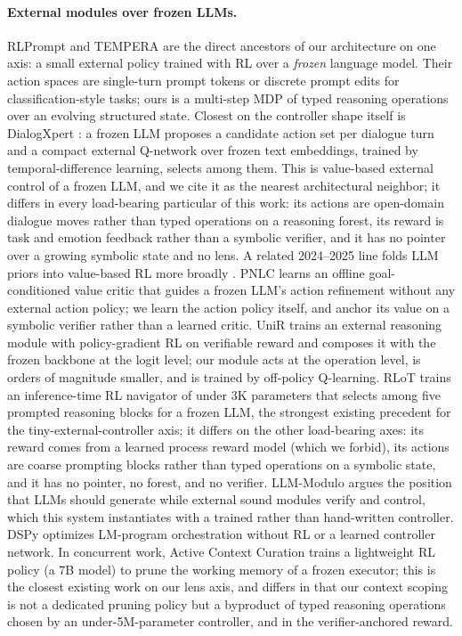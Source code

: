 \paragraph{External modules over frozen LLMs.}
RLPrompt \citep{rlprompt} and TEMPERA \citep{tempera} are the direct
ancestors of our architecture on one axis: a small external policy trained
with RL over a \emph{frozen} language model. Their action spaces are
single-turn prompt tokens or discrete prompt edits for classification-style
tasks; ours is a multi-step MDP of typed reasoning operations over an
evolving structured state. Closest on the controller shape itself is
DialogXpert \citep{dialogxpert}: a frozen LLM proposes a candidate action
set per dialogue turn and a compact external Q-network over frozen text
embeddings, trained by temporal-difference learning, selects among them.
This is value-based external control of a frozen LLM, and we cite it as the
nearest architectural neighbor; it differs in every load-bearing
particular of this work: its actions are open-domain dialogue moves rather
than typed operations on a reasoning forest, its reward is task and emotion
feedback rather than a symbolic verifier, and it has no pointer over a
growing symbolic state and no lens. A related 2024--2025 line folds LLM
priors into value-based RL more broadly \citep{linvit, llmpriorsrl}. PNLC
\citep{pnlc} learns an offline goal-conditioned value critic that guides a
frozen LLM's action refinement without any external action policy; we learn
the action policy itself, and anchor its value on a symbolic verifier rather
than a learned critic. UniR \citep{unir} trains an external reasoning
module with policy-gradient RL on verifiable reward and composes it with
the frozen backbone at the logit level; our module acts at the operation
level, is orders of magnitude smaller, and is trained by off-policy
Q-learning. RLoT \citep{rlot} trains an inference-time RL navigator of
under 3K parameters that selects among five prompted reasoning blocks for
a frozen LLM, the strongest existing precedent for the
tiny-external-controller axis; it differs on the other load-bearing axes:
its reward comes from a learned process reward model (which we forbid),
its actions are coarse prompting blocks rather than typed operations on a
symbolic state, and it has no pointer, no forest, and no verifier. LLM-Modulo \citep{llmmodulo} argues
the position that LLMs should generate while external sound modules
verify and control, which this system instantiates with a trained rather
than hand-written controller. DSPy \citep{dspy} optimizes LM-program
orchestration without RL or a learned controller network. In concurrent
work, Active Context Curation
\citep{contextcuration} trains a lightweight RL policy (a 7B model) to prune
the working memory of a frozen executor; this is the closest existing work
on our lens axis, and differs in that our context scoping is not a dedicated
pruning policy but a byproduct of typed reasoning operations chosen by an
under-5M-parameter controller, and in the verifier-anchored reward.

